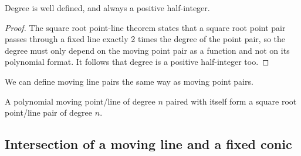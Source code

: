 \documentclass[a4paper]{article}
\begin{document}
\begin{lemma}
    Degree is well defined, and always a positive half-integer.
\end{lemma}
\begin{proof}
    The square root point-line theorem states that a square root point pair passes through a fixed line exactly 2 times the degree of the point pair, so the degree must only depend on the moving point pair as a function and not on its polynomial format. It follows that degree is a positive half-integer too.
\end{proof}
We can define moving line pairs the same way as moving point pairs.
\begin{remark}
    A polynomial moving point/line of degree $n$ paired with itself form a square root point/line pair of degree $n$.
\end{remark}

\subsection{Intersection of a moving line and a fixed conic}
\end{document}
